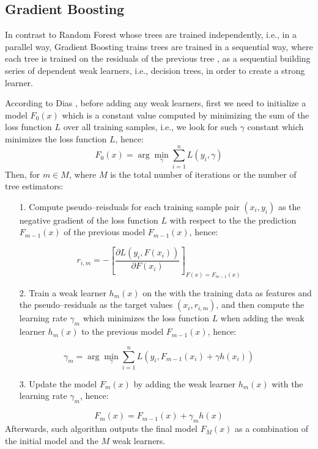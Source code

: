 \subsection{Gradient Boosting}
In contrast to Random Forest whose trees are trained independently, i.e., in a parallel way, Gradient Boosting trains trees are trained in a sequential way, where each tree is trained on the residuals of the previous tree \citep{ayyadevara2018pro}, as a sequential building series of dependent weak learners, i.e., decision trees, in order to create a strong learner.

According to Dias \citep{dias2018comparison}, before adding any weak learners, first we need to initialize a model $F_0(x)$ which is a constant value computed by minimizing the sum of the loss function $L$ over all training samples, i.e., we look for such $\gamma$ constant which minimizes the loss function $L$, hence:
\begin{equation}
    F_{0}(x) = \arg \min _{\gamma} \sum_{i=1}^{n} L\left(y_{i}, \gamma\right)
\end{equation}
Then, for $m \in M$, where $M$ is the total number of iterations or the number of tree estimators:
\begin{itemize}\setlength\itemsep{0em}
    \item[1.] Compute pseudo--reisduals for each training sample pair $(x_i, y_i)$ as the negative gradient of the loss function $L$ with respect to the the prediction $F_{m-1}(x)$ of the previous model $F_{m-1}(x)$, hence:
\end{itemize}
\begin{equation}
    r_{i,m} = -\left[\frac{\partial L\left(y_{i}, F\left(x_{i}\right)\right)}{\partial F\left(x_{i}\right)}\right]_{F(x)=F_{m-1}(x)}
\end{equation}
\begin{itemize}\setlength\itemsep{0em}
    \item[2.] Train a weak learner $h_m(x)$ on the with the training data as features and the pseudo--residuals as the target values $(x_i, r_{i,m})$, and then compute the learning rate $\gamma_m$ which minimizes the loss function $L$ when adding the weak learner $h_m(x)$ to the previous model $F_{m-1}(x)$, hence:
\end{itemize}
\begin{equation}
    \gamma_{m} = \arg \min _{\gamma} \sum_{i=1}^{n} L\left(y_{i}, F_{m-1}\left(x_{i}\right)+\gamma h\left(x_{i}\right)\right)
\end{equation}
\begin{itemize}\setlength\itemsep{0em}
    \item[3.] Update the model $F_m(x)$ by adding the weak learner $h_m(x)$ with the learning rate $\gamma_m$, hence:
\end{itemize}
\begin{equation}
    F_m(x) = F_{m-1}(x) + \gamma_m h(x)
\end{equation}
Afterwards, such algorithm outputs the final model $F_M(x)$ as a combination of the initial model and the $M$ weak learners.

